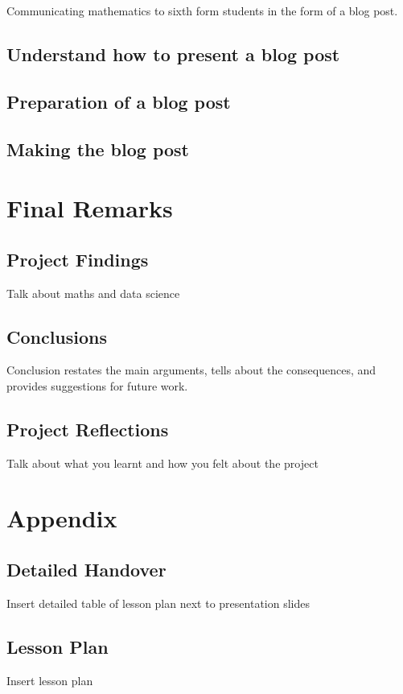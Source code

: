 \documentclass[12pt, a4paper,oneside]{book}
\numberwithin{equation}{section}
\begin{document}
Communicating mathematics to sixth form students in the form of a blog post.

\section{Understand how to present a blog post}\label{sec:x.x}


\section{Preparation of a blog post}\label{sec:x.x}


\section{Making the blog post}\label{sec:x.x}


\chapter{Final Remarks}\label{ch:concl}
\section{Project Findings}
Talk about maths and data science

\section{Conclusions}
Conclusion restates the main arguments, tells about the consequences, and provides suggestions for future work.

\section{Project Reflections}
Talk about what you learnt and how you felt about the project

\chapter*{Appendix}
\appendix
{}

\section*{Detailed Handover}
Insert detailed table of lesson plan next to presentation slides

\section*{Lesson Plan}
Insert lesson plan
\end{document}
